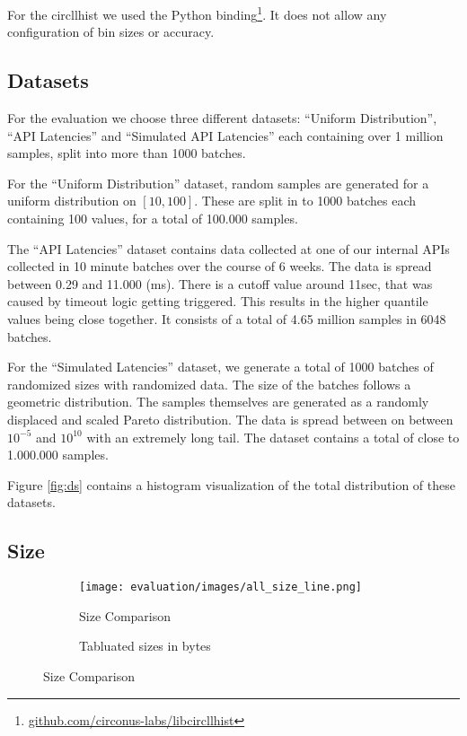 \documentclass{article}
\theoremstyle{plain}
\theoremstyle{remark}
\begin{document}
For the circllhist we used the Python binding\footnote{\url{github.com/circonus-labs/libcircllhist}}.
It does not allow any configuration of bin sizes or accuracy.

\subsection{Datasets}

For the evaluation we choose three different datasets: ``Uniform Distribution'', ``API Latencies'' and ``Simulated API Latencies''
each containing over 1 million samples, split into more than 1000 batches.

For the ``Uniform Distribution'' dataset, random samples are generated for a uniform distribution on $[10,100]$.
These are split in to 1000 batches each containing 100 values, for a total of 100.000 samples.

The ``API Latencies'' dataset contains data collected at one of our internal APIs collected in 10
minute batches over the course of 6 weeks.  The data is spread between 0.29 and 11.000 (ms).  There
is a cutoff value around 11sec, that was caused by timeout logic getting triggered.  This results in
the higher quantile values being close together.  It consists of a total of 4.65 million samples in
6048 batches.

For the ``Simulated Latencies'' dataset, we generate a total of 1000 batches of randomized sizes
with randomized data.  The size of the batches follows a geometric distribution.  The samples
themselves are generated as a randomly displaced and scaled Pareto distribution.  The data is
spread between on between $10^{-5}$ and $10^{10}$ with an extremely long tail.  The dataset contains
a total of close to 1.000.000 samples.

Figure \ref{fig:ds} contains a histogram visualization of the total distribution of these datasets.

\subsection{Size}

\begin{figure}
    \begin{subfigure}{0.33\textwidth}
      \texttt{[image: evaluation/images/all\_size\_line.png]}
      \caption{Size Comparison}
      \label{fig:size}
    \end{subfigure}
    \begin{subfigure}{0.66\textwidth}
      
      \caption{Tabluated sizes in bytes}
      \label{fig:tsize}
    \end{subfigure}
    \caption{Size Comparison}
\end{figure}
\end{document}
